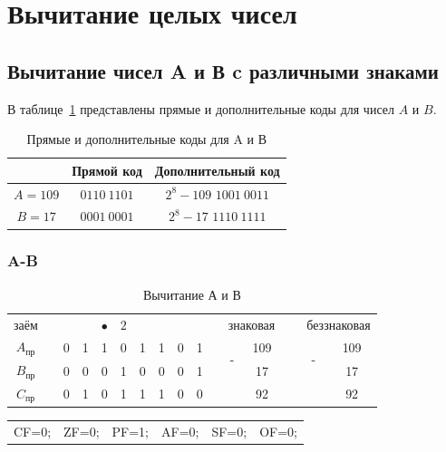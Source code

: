 \section{Вычитание целых чисел}
\subsection{Вычитание чисел A и В c различными знаками}

В таблице~\ref{tab:a-b-dop2} представлены прямые и дополнительные коды
для чисел $A$ и $B$.

\begin{table}[H]
    \centering
    \caption{Прямые и дополнительные коды для A и В}
	\label{tab:a-b-dop2}
    \begin{tabular}{|c|c|c|}
		\hline
		 & Прямой код & Дополнительный код \\
		\hline
		$A=109$ & $0110\ 1101$ & \makecell{$2^8-109$\\$1001\ 0011$}  \\
		\hline
		$B=17$ & $0001\ 0001$ & \makecell{$2^8-17$\\$1110\ 1111$} \\
		\hline
    \end{tabular}
\end{table}

\subsubsection{A-B}

\begin{table}[H]
    \centering
    \caption{Вычитание А и В}
    \begin{tabular}{c|cc|cccccccp{1cm}ccp{0.5cm}cc}
		\small заём & & & & $\bullet$ & $2$ & & & & & & \multicolumn{2}{c}{знаковая} & \  & \multicolumn{2}{c}{беззнаковая}  \\
		\cline{1-10} \cline{12-13} \cline{15-16}
		$A_{\text{пр}}$ & & 0 & 1 & 1 & 0 & 1 & 1 & 0 & 1 & & \multirow{2}{*}{-} & 109 & \  & \multirow{2}{*}{-} & 109   \\
		$B_{\text{пр}}$ & & 0 & 0 & 0 & 1 & 0 & 0 & 0 & 1 & & & 17 & \  &  & 17 \\
		\cline{1-10} \cline{12-13} \cline{15-16}
		$C_{\text{пр}}$ & & 0 & 1 & 0 & 1 & 1 & 1 & 0 & 0 & & & 92 & \  &  & 92 \\
    \end{tabular}
\end{table}

\begin{table}[H]
    \centering
    \begin{tabular}{cccccc}
        CF=0; & ZF=0; & PF=1; & AF=0; & SF=0; & OF=0;
    \end{tabular}
\end{table}

